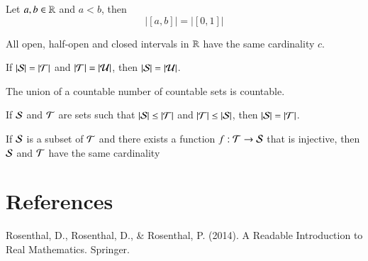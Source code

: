 \documentclass[11pt]{article}
\begin{document}
		\begin{theorem}[10.2.4]
			Let $a, b \in \mathbb{R}$ and $a < b$, then
			\[
				|[a,b]| = |[0,1]|
			\]
		\end{theorem}
		
		\begin{theorem}
			All open, half-open and closed intervals in $\mathbb{R}$ have the same cardinality $c$.
		\end{theorem}
		
		\begin{theorem}[10.2.7]
			If $|\mathcal{{S}}| = |\mathcal{{T}}|$ and $|\mathcal{{T}}| = |\mathcal{{U}}|$, then $|\mathcal{{S}}| = |\mathcal{{U}}|$.
		\end{theorem}
		
		\begin{theorem}[10.2.10]
			The union of a countable number of countable sets is countable.
		\end{theorem}
		
		\begin{theorem} If $\mathcal{{S}}$ and $\mathcal{{T}}$ are sets such that $|\mathcal{{S}}| \leq |\mathcal{{T}}|$ and $|\mathcal{{T}}| \leq |\mathcal{{S}}|$, then $|\mathcal{{S}}| = |\mathcal{{T}}|$.
		\end{theorem}
		
		\begin{corollary}[10.3.6]
			If $\mathcal{{S}}$ is a subset of $\mathcal{{T}}$ and there exists a function $f: \mathcal{{T}} \to \mathcal{{S}}$ that is injective, then $\mathcal{{S}}$ and $\mathcal{{T}}$ have the same cardinality
		\end{corollary}
		
		\section*{References}
			Rosenthal, D., Rosenthal, D., \& Rosenthal, P. (2014). A Readable Introduction to Real Mathematics. Springer.
\end{document}
